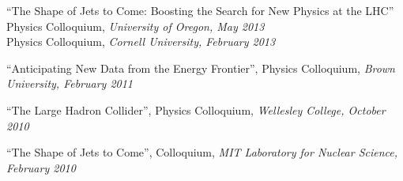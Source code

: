 \item ``The Shape of Jets to Come:  Boosting the Search for New Physics at the LHC''
\\ \sh Physics Colloquium, \emph{University of Oregon, May 2013}
\\ \sh Physics Colloquium, \emph{Cornell University, February 2013}

\item ``Anticipating New Data from the Energy Frontier'', Physics Colloquium, \emph{Brown University, February 2011}

\item ``The Large Hadron Collider'', Physics Colloquium, \emph{Wellesley College, October 2010}

\item ``The Shape of Jets to Come'', Colloquium, \emph{MIT Laboratory for Nuclear Science, February 2010}

\el
